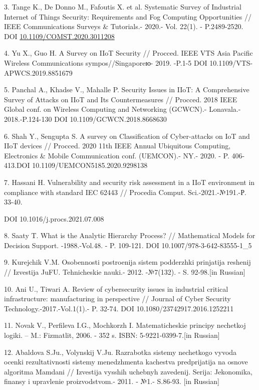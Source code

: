 \documentclass[
]{article}
\begin{document}
3. Tange K., De Donno M., Fafoutis X. et al. Systematic Survey of
Industrial Internet of Things Security: Requirements and Fog Computing
Opportunities // IEEE Communications Surveys \& Tutorials.- 2020.- Vol.
22(1). - P.2489-2520. DOI
\href{http://dx.doi.org/10.1109/COMST.2020.3011208}{10.1109/COMST.2020.3011208}

4. Yu X., Guo H. A Survey on IIoT Security // Procced. IEEE VTS Asia
Pacific Wireless Communications sympos//Singaporeю- 2019. -P.1-5 DOI
10.1109/VTS-APWCS.2019.8851679

5. Panchal A., Khadse V., Mahalle P. Security Issues in IIoT: A
Comprehensive Survey of Attacks on IIoT and Its Countermeasures //
Procced. 2018 IEEE Global conf. on Wireless Computing and Networking
(GCWCN).- Lonavala.- 2018.-P.124-130 DOI 10.1109/GCWCN.2018.8668630

6. Shah Y., Sengupta S. A survey on Classification of Cyber-attacks on
IoT and IIoT devices // Procced. 2020 11th IEEE Annual Ubiquitous
Computing, Electronics \& Mobile Communication conf. (UEMCON).- NY.-
2020. - P. 406-413.DOI 10.1109/UEMCON5185.2020.9298138

7. Hassani H. Vulnerability and security risk assessment in a IIoT
environment in compliance with standard IEC 62443 // Procedia Comput.
Sci.-2021.-№191.-Р. 33-40.

DOI 10.1016/j.procs.2021.07.008

8. Saaty T. What is the Analytic Hierarchy Process? // Mathematical
Models for Decision Support. -1988.-Vol.48. - P. 109-121. DOI
10.1007/978-3-642-83555-1\_5

9. Kurejchik V.M. Osobennosti postroenija sistem podderzhki prinjatija
reshenij // Izvestija JuFU. Tehnicheskie nauki.- 2012. -№7(132). - S.
92-98.{[}in Russian{]}

10. Ani U., Tiwari A. Review of cybersecurity issues in industrial
critical infrastructure: manufacturing in perspective // Journal of
Cyber Security Technology.-2017.-Vol.1(1).- P. 32-74. DOI
10.1080/23742917.2016.1252211

11. Novak V., Perfil\textquotesingle eva I.G., Mochkorzh I.
Matematicheskie principy nechetkoj logiki. -- M.: Fizmatlit, 2006. - 352
s. ISBN: 5-9221-0399-7.{[}in Russian{]}

12. Abaldova S.Ju., Volynskij V.Ju. Razrabotka sistemy nechetkogo vyvoda
ocenki rezul\textquotesingle tativnosti sistemy menedzhmenta kachestva
predprijatija na osnove algoritma Mamdani // Izvestija vysshih uchebnyh
zavedenij. Serija: Jekonomika, finansy i upravlenie proizvodstvom.-
2011. - №1.- S.86-93. {[}in Russian{]}
\end{document}
